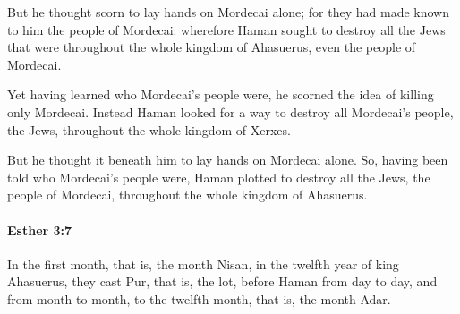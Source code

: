 			\begin{versebox}
					\item[BHS] 
					\item[LXX] 
					\item[ASV] But he thought scorn to lay hands on Mordecai alone; for they had made known to him the people of Mordecai: wherefore Haman sought to destroy all the Jews that were throughout the whole kingdom of Ahasuerus, even the people of Mordecai.
					\item[NIV] Yet having learned who Mordecai’s people were, he scorned the idea of killing only Mordecai. Instead Haman looked for a way to destroy all Mordecai’s people, the Jews, throughout the whole kingdom of Xerxes.
					\item[NRSV] But he thought it beneath him to lay hands on Mordecai alone. So, having been told who Mordecai’s people were, Haman plotted to destroy all the Jews, the people of Mordecai, throughout the whole kingdom of Ahasuerus.
			\end{versebox}

		\paragraph{Esther 3:7} %
			\label{ESTHER-3-7}

			In the first month, that is, the month Nisan, in the twelfth year of king Ahasuerus, they cast Pur, that is, the lot, before Haman from day to day, and from month to month, to the twelfth month, that is, the month Adar.

